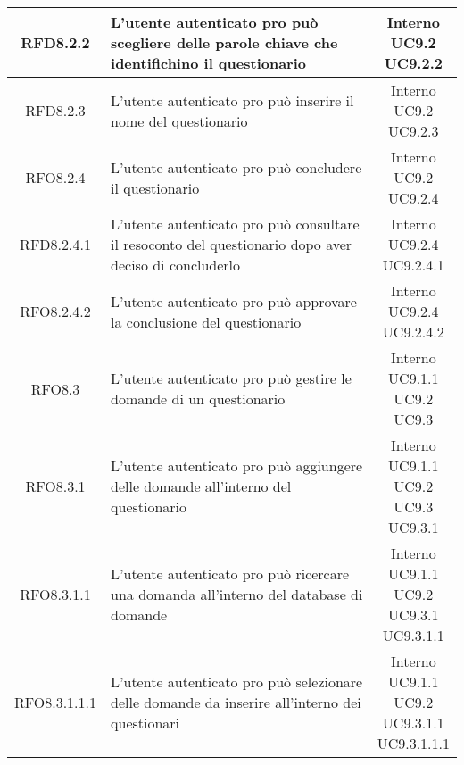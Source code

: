 \begin{longtable}{|c|>{\centering}m{7cm}|c|}
			 \hypertarget{{RFD8.2.2}}{{RFD8.2.2}} & L’utente autenticato pro può scegliere delle parole chiave che identifichino il questionario & \makecell{Interno\\ UC9.2 \\UC9.2.2 } \\ \hline
			 \hypertarget{{RFD8.2.3}}{{RFD8.2.3}} & L’utente autenticato pro può inserire il nome del questionario & \makecell{Interno\\ UC9.2 \\UC9.2.3 } \\ \hline
			 \hypertarget{{RFO8.2.4}}{{RFO8.2.4}} & L’utente autenticato pro può concludere il questionario & \makecell{Interno\\ UC9.2 \\UC9.2.4 } \\ \hline
			 \hypertarget{{RFD8.2.4.1}}{{RFD8.2.4.1}} & L’utente autenticato pro può consultare il resoconto del questionario dopo aver deciso di concluderlo & \makecell{Interno\\ UC9.2.4 \\UC9.2.4.1 } \\ \hline
			 \hypertarget{{RFO8.2.4.2}}{{RFO8.2.4.2}} & L’utente autenticato pro può approvare la conclusione del questionario & \makecell{Interno\\ UC9.2.4 \\UC9.2.4.2 } \\ \hline
			 \hypertarget{{RFO8.3}}{{RFO8.3}} & L’utente autenticato pro può gestire le domande di un questionario & \makecell{Interno\\ UC9.1.1 \\UC9.2 \\UC9.3 } \\ \hline
			 \hypertarget{{RFO8.3.1}}{{RFO8.3.1}} & L’utente autenticato pro può aggiungere delle domande all’interno del questionario & \makecell{Interno\\ UC9.1.1 \\UC9.2 \\UC9.3 \\UC9.3.1 } \\ \hline
			 \hypertarget{{RFO8.3.1.1}}{{RFO8.3.1.1}} & L’utente autenticato pro può ricercare una domanda all’interno del database di domande & \makecell{Interno\\ UC9.1.1 \\UC9.2 \\UC9.3.1 \\UC9.3.1.1 } \\ \hline
			 \hypertarget{{RFO8.3.1.1.1}}{{RFO8.3.1.1.1}} & L’utente autenticato pro può selezionare delle domande da inserire all’interno dei questionari & \makecell{Interno\\ UC9.1.1 \\UC9.2 \\UC9.3.1.1 \\UC9.3.1.1.1 } \\ \hline

\end{longtable}
